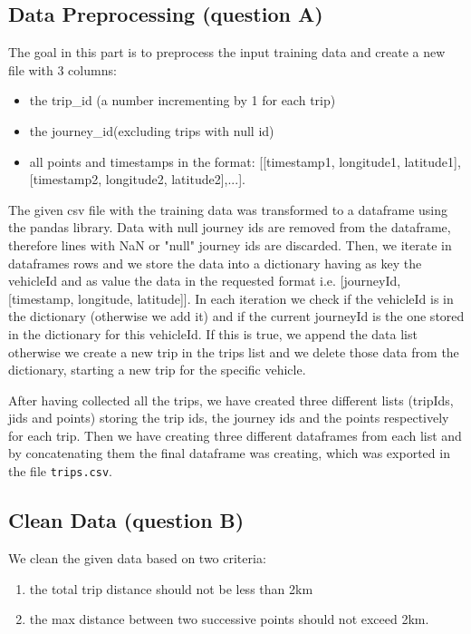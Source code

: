 \documentclass[12pt]{article}
\begin{document}
	\subsection{Data Preprocessing (question A)}
	The goal in this part is to preprocess the input training data and create a
  new file with 3 columns:
  \begin{itemize}
  \item  the trip\_id (a number incrementing by 1 for each trip)
  \item the journey\_id(excluding trips with null id)
  \item all points and timestamps in the format: [[timestamp1, longitude1,
    latitude1], [timestamp2, longitude2, latitude2],...].
  \end{itemize}
  The given csv file with the training data was transformed to a dataframe using the pandas library. Data with null journey ids are removed from the dataframe, therefore lines with NaN or "null" journey ids are discarded. Then, we iterate in dataframes rows and we store the data into a dictionary having as key the vehicleId and as value the data in the requested format i.e. [journeyId, [timestamp, longitude, latitude]]. In each iteration we check if the vehicleId is in the dictionary (otherwise we add it) and if the current journeyId is the one stored in the dictionary for this vehicleId. If this is true, we append the data list otherwise we create a new trip in the trips list and we delete those data from the dictionary, starting a new trip for the specific vehicle.
  
  After having collected all the trips, we have created three different lists (tripIds, jids and points) storing the trip ids, the journey ids and the points respectively for each trip. Then we have creating three different dataframes from each list and by concatenating them the final dataframe was creating, which was exported in the file \texttt{trips.csv}.
	
	\subsection{Clean Data (question B)}
	We clean the given data based on two criteria:
  \begin{enumerate}
  \item the total trip distance should not be less than 2km
  \item the max distance between two successive points should not exceed 2km.
    \end{enumerate}
	
\end{document}
